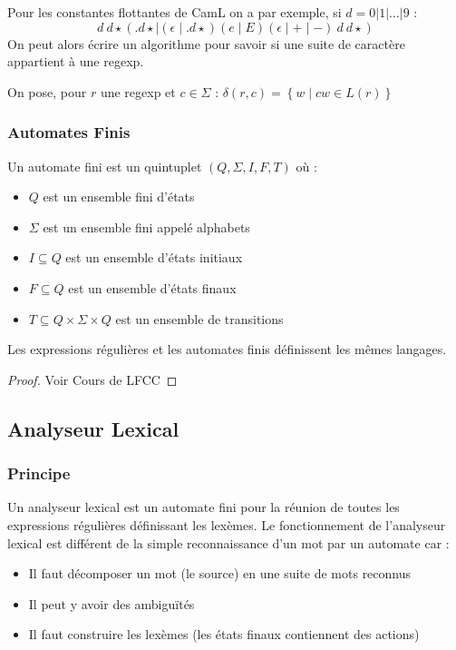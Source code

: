 \documentclass{cours}
\begin{document}
Pour les constantes flottantes de CamL on a par exemple, si $d = 0 | 1 | \ldots | 9$ :
\[
    d\ d\star(.d\star \mid (\epsilon \mid .d\star)(e \mid E)(\epsilon \mid + \mid -)\ d\ d\star)
\]
On peut alors écrire un algorithme pour savoir si une suite de caractère appartient à une regexp.
\begin{definition}
    On pose, pour $r$ une regexp et $c \in \Sigma$ : $\delta(r, c) = \left\{w \mid cw \in L(r)\right\}$
\end{definition}

\subsubsection{Automates Finis}
\begin{definition}[Syntaxe]
    Un automate fini est un quintuplet $(Q, \Sigma, I, F, T)$ où :
    \begin{itemize}
        \item $Q$ est un ensemble fini d'états
        \item $\Sigma$ est un ensemble fini appelé alphabets
        \item $I \subseteq Q$ est un ensemble d'états initiaux
        \item $F \subseteq Q$ est un ensemble d'états finaux
        \item $T \subseteq Q \times \Sigma \times Q$ est un ensemble de transitions
    \end{itemize}
\end{definition}

\begin{theorem}[De Kleene]
    Les expressions régulières et les automates finis définissent les mêmes langages.
\end{theorem}
\begin{proof}
    Voir Cours de LFCC
\end{proof}

\subsection{Analyseur Lexical}

\subsubsection{Principe}

Un analyseur lexical est un automate fini pour la réunion de toutes les expressions régulières définissant les lexèmes.
Le fonctionnement de l'analyseur lexical est différent de la simple reconnaissance d'un mot par un automate car :
\begin{itemize}
    \item Il faut décomposer un mot (le source) en une suite de mots reconnus
    \item Il peut y avoir des ambiguïtés
    \item Il faut construire les lexèmes (les états finaux contiennent des actions)
\end{itemize}
\end{document}
